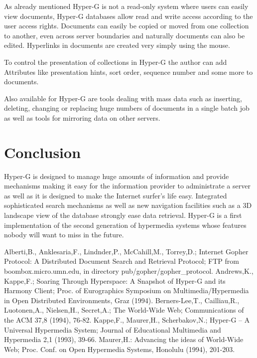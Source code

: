As already mentioned Hyper-G is not a read-only system where users can
easily view documents, Hyper-G databases allow read and write access
according to the user access rights. Documents can easily be copied or
moved from one collection to another, even across server boundaries
and naturally documents can also be edited. Hyperlinks in documents
are created very simply using the mouse.

To control the presentation of collections in Hyper-G the author can
add Attributes like presentation hints, sort order, sequence number
and some more to documents.

Also available for Hyper-G are tools dealing with mass data such as
inserting, deleting, changing or replacing huge numbers of documents
in a single batch job as well as tools for mirroring data on other
servers.

\section{Conclusion}

Hyper-G is designed to manage huge amounts of information and provide
mechanisms making it easy for the information provider to administrate
a server as well as it is designed to make the Internet surfer's life
easy. Integrated sophisticated search mechanisms as well as new
navigation facilities such as a 3D landscape view of the database
strongly ease data retrieval. Hyper-G is a first implementation of the
second generation of hypermedia systems whose features nobody will
want to miss in the future.


\begin{thebibliography}{99999}
\bibitem[Alberti et al 1992]{} Alberti,B., Anklesaria,F., Lindnder,P.,
  McCahill,M., Torrey,D.; Internet Gopher Protocol: A Distributed
  Document Search and Retrieval Protocol; FTP from
  boombox.micro.umn.edu, in directory pub/gopher/gopher\_protocol.
\bibitem[Andrews et al 1994]{} Andrews,K., Kappe,F.; Soaring Through Hyperspace:
  A Snapshot of Hyper-G and its Harmony Client; Proc. of Eurographics
  Symposium on Multimedia/Hypermedia in Open Distributed
  Environments, Graz (1994).
 Berners-Lee,T., Cailliau,R., Luotonen,A.,
  Nielsen,H., Secret,A.; The World-Wide Web; Communications of the
  ACM 37,8 (1994), 76-82.
\bibitem[Kappe et al 1993]{} Kappe,F., Maurer,H., Scherbakov,N.; Hyper-G -- A
  Universal Hypermedia System; Journal of Educational Multimedia and
  Hypermedia 2,1 (1993), 39-66.
\bibitem[Maurer 1994]{} Maurer,H.: Advancing the ideas of World-Wide Web;
  Proc. Conf. on Open Hypermedia Systems, Honolulu (1994), 201-203.

\end{thebibliography}


